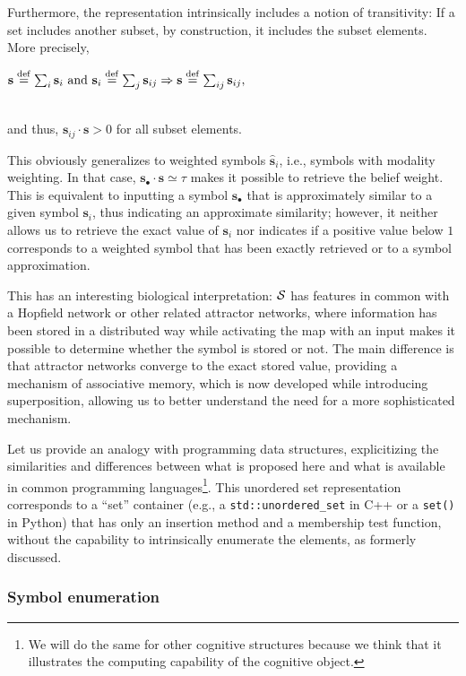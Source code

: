 \documentclass[sn-mathphys]{sn-jnl}
\newcommand{\defq}{\stackrel {\rm def}{=}}
\newcommand{\eqline}[1]{~\vspace{0.1cm}\\\centerline{$#1$}\vspace{0.1cm}\\}
\begin{document}
\begin{appendices}
Furthermore, the representation intrinsically includes a notion of transitivity: If a set includes another subset, by construction, it includes the subset elements. More precisely,
\eqline{\mathbf{s} \defq \sum_i \mathbf{s}_i \mbox{ and } \mathbf{s}_i \defq \sum_j \mathbf{s}_{ij} \Rightarrow \mathbf{s} \defq \sum_{ij} \mathbf{s}_{ij},}
and thus, $\mathbf{s}_{ij} \cdot \mathbf{s} > 0$ for all subset elements.

This obviously generalizes to weighted symbols $\hat{\mathbf{s}}_i$, i.e., symbols with modality weighting. In that case, $\mathbf{s}_\bullet \cdot \mathbf{s} \simeq \tau$ makes it possible to retrieve the belief weight. This is equivalent to inputting a symbol $\mathbf{s}_\bullet$ that is approximately similar to a given symbol $\mathbf{s}_i$, thus indicating an approximate similarity; however, it neither allows us to retrieve the exact value of $\mathbf{s}_i$ nor indicates if a positive value below $1$ corresponds to a weighted symbol that has been exactly retrieved or to a symbol approximation.

This has an interesting biological interpretation: ${\cal S}$ has features in common with a Hopfield network or other related attractor networks, where information has been stored in a distributed way while activating the map with an input makes it possible to determine whether the symbol is stored or not. The main difference is that attractor networks converge to the exact stored value, providing a mechanism of associative memory, which is now developed while introducing superposition, allowing us to better understand the need for a more sophisticated mechanism.

Let us provide an analogy with programming data structures, explicitizing the similarities and differences between what is proposed here and what is available in common programming languages\footnote{We will do the same for other cognitive structures because we think that it illustrates the computing capability of the cognitive object.}. This unordered set representation corresponds to a ``set'' container (e.g., a {\tt std::unordered\_set} in C++ or a {\tt set()} in Python) that has only an insertion method and a membership test function, without the capability to intrinsically enumerate the elements, as formerly discussed.

\subsubsection{Symbol enumeration}


\end{appendices}
\end{document}
